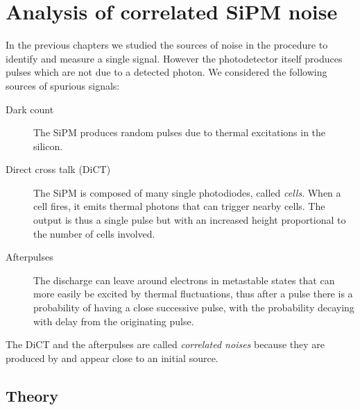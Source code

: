 \chapter{Analysis of correlated SiPM noise}
\label{ch:anal}


In the previous chapters we studied the sources of noise in the procedure to
identify and measure a single signal. However the photodetector itself produces
pulses which are not due to a detected photon. We considered the following
sources of spurious signals:
%
\begin{description}
    
    \item[Dark count] The SiPM produces random pulses due to thermal
    excitations in the silicon.
    
    \item[Direct cross talk (DiCT)] The SiPM is composed of many single
    photodiodes, called \emph{cells}. When a cell fires, it emits thermal
    photons that can trigger nearby cells. The output is thus a single pulse
    but with an increased height proportional to the number of cells involved.
    
    \item[Afterpulses] The discharge can leave around electrons in metastable
    states that can more easily be excited by thermal fluctuations, thus after
    a pulse there is a probability of having a close successive pulse, with the
    probability decaying with delay from the originating pulse.

\end{description}


The DiCT and the afterpulses are called \emph{correlated noises} because they
are produced by and appear close to an initial source.

\section{Theory}

